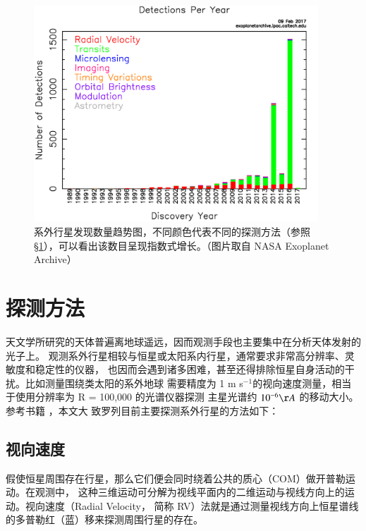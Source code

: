 \begin{figure}[hb]
\centering
\includegraphics[width=0.95\textwidth]{figures/chapter1/fig3_nasaexo_dischist.jpg}
\caption{系外行星发现数量趋势图，不同颜色代表不同的探测方法（参照 \S \ref{sec:detmeth}），可以看出该数目呈现指数式增长。（图片取自 NASA Exoplanet Archive）}
\label{fig:pltdiscyear}
\end{figure}



\section{探测方法} \label{sec:detmeth}

天文学所研究的天体普遍离地球遥远，因而观测手段也主要集中在分析天体发射的光子上。
观测系外行星相较与恒星或太阳系内行星，通常要求非常高分辨率、灵敏度和稳定性的仪器，
也因而会遇到诸多困难，甚至还得排除恒星自身活动的干扰。比如测量围绕类太阳的系外地球
需要精度为 1 m s$^{-1}$的视向速度测量，相当于使用分辨率为 R = 100,000 的光谱仪器探测
主星光谱约 $10^{-6} \AA$ 的移动大小。参考书籍 ，本文大
致罗列目前主要探测系外行星的方法如下：

\subsection{视向速度}

假使恒星周围存在行星，那么它们便会同时绕着公共的质心（COM）做开普勒运动。在观测中，
这种三维运动可分解为视线平面内的二维运动与视线方向上的运动。视向速度（Radial Velocity，
简称 RV）法就是通过测量视线方向上恒星谱线的多普勒红（蓝）移来探测周围行星的存在。

